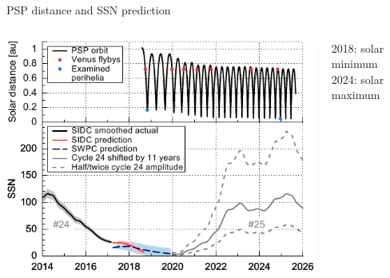 \begin{frame}[plain,c]{PSP distance and SSN prediction}{}
	\begin{columns}[c]
		
		\includegraphics[width=\textwidth]{../figures_paper/SPP_orbit_predicted_SSN_overview_f_plot.pdf}

		
		2018: solar minimum\\
		2024: solar maximum

	\end{columns}
\end{frame}

